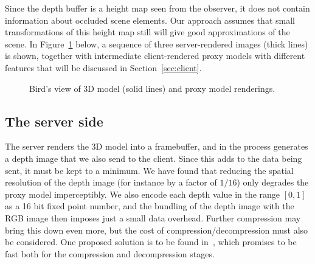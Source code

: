 Since the depth buffer is a height map seen from the observer, it
does not contain information about occluded scene elements. Our approach assumes
that small transformations of this height map still will give good
approximations of the scene. In Figure~\ref{fig:2DheightmapRotated} below, a
sequence of three server-rendered images (thick lines) is shown, together with
intermediate client-rendered proxy models with different features that will be
discussed in Section~\ref{sec:client}.

\begin{figure}[htb]
  \centering
  \caption{\label{fig:2DheightmapRotated}
Bird's view of 3D model (solid lines) and proxy model renderings.
}
\end{figure}



\subsection{The server side}

The server renders the 3D model into a framebuffer, and in the process generates
a depth image that we also send to the client.
Since this adds to the data being sent, it must be kept to a minimum. We have
found that reducing the spatial resolution of the depth image (for instance by a
factor of $1/16$) only degrades the proxy model imperceptibly.  We also encode
each depth value in the range $[0, 1]$ as a 16 bit fixed point number, and the
bundling of the depth image with the RGB image then imposes just a small data
overhead.
Further compression may bring this down even more, but the cost of
compression/decompression must also be
considered.
One proposed solution is to be found in~\cite{DBLP:journals/tvcg/Lindstrom14},
which promises to be fast both for the compression and decompression stages.


